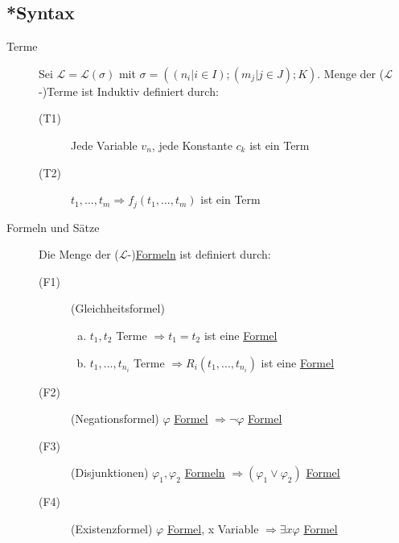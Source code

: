 \documentclass[12pt,a4paper]{article} %
\begin{document}
	\subsection{*Syntax}
	\label{Term}
	\begin{description}
		\item[Terme] Sei $\mathcal{L} = \mathcal{L}(\sigma)$ mit $\sigma = ((n_i | i \in I); (m_j | j \in J); K)$. Menge der ($\mathcal{L}$-)Terme ist Induktiv definiert durch:
		\begin{description}
			\item[(T1)] Jede Variable $v_n$, jede Konstante $c_k$ ist ein Term
			\item[(T2)] $t_1, ..., t_m \Rightarrow f_j(t_1, ..., t_m)$ ist ein Term
		\end{description}
		\item[Formeln und Sätze]
		Die Menge der ($\mathcal{L}$-)\hyperref[Formel]{Formeln} ist definiert durch:
		
		\begin{description}
			\item[(F1)] (Gleichheitsformel) \begin{enumerate}[(a)]
				\item $t_1, t_2$ Terme $\Rightarrow t_1 = t_2$ ist eine \hyperref[Formel]{Formel}
				\item $t_1, ..., t_{n_i}$ Terme $\Rightarrow R_i(t_1, ..., t_{n_i})$ ist eine \hyperref[Formel]{Formel}
			\end{enumerate}
			\item[(F2)] (Negationsformel) $\varphi$ \hyperref[Formel]{Formel} $\Rightarrow \neg \varphi$ \hyperref[Formel]{Formel}
			\item[(F3)] (Disjunktionen) $\varphi_1, \varphi_2$ \hyperref[Formel]{Formeln} $\Rightarrow (\varphi_1 \lor \varphi_2)$ \hyperref[Formel]{Formel} \\
			\item[(F4)] (Existenzformel) $\varphi$ \hyperref[Formel]{Formel}, x Variable $\Rightarrow \exists x \varphi$ \hyperref[Formel]{Formel}
		\end{description}
	\end{description}
\end{document}
